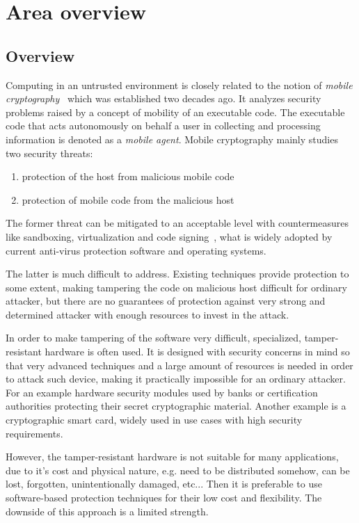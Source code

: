 \documentclass[11pt,oneside,final]{fithesis2}
\begin{document}
\chapter{Area overview}\label{sec:theory}
    
    \section{Overview}
    Computing in an untrusted environment is closely related to the notion of \emph{mobile cryptography}~\citep{mobile_cryptography} which was established two decades ago.
    It analyzes security problems raised by a concept of mobility of an executable code. The executable code that acts autonomously on behalf a user in collecting 
    and processing information is denoted as a \emph{mobile agent}. Mobile cryptography mainly studies two security threats:
    \begin{enumerate}
     \item protection of the host from malicious mobile code
     \item protection of mobile code from the malicious host
    \end{enumerate}
    
    The former threat can be mitigated to an acceptable level with countermeasures like sandboxing, virtualization and code signing~\citep{Menezes:1996:HAC:548089},
    what is widely adopted by current anti-virus protection software and operating systems.
    
    The latter is much difficult
    to address. Existing techniques provide protection to some extent, making tampering the code on malicious host difficult for ordinary attacker,
    but there are no guarantees of protection against very strong and determined attacker with enough resources to invest in the attack.
    
    In order to make tampering of the software very difficult, specialized, tamper-resistant hardware is often used.
    It is designed with security concerns in mind so that very advanced techniques and a large amount of resources is needed in order to attack such device,
    making it practically impossible for an ordinary attacker. For an example hardware security modules used by banks or certification 
    authorities protecting their secret cryptographic material. Another example is a cryptographic smart card, widely used in use 
    cases with high security requirements.    

    However, the tamper-resistant hardware is not suitable for many applications, due to it's cost and physical nature, e.g. need to be distributed somehow, 
    can be lost, forgotten, unintentionally damaged, etc...
    Then it is preferable to use software-based protection techniques for their low cost and flexibility. The downside of this approach is a limited strength.
    
\end{document}
